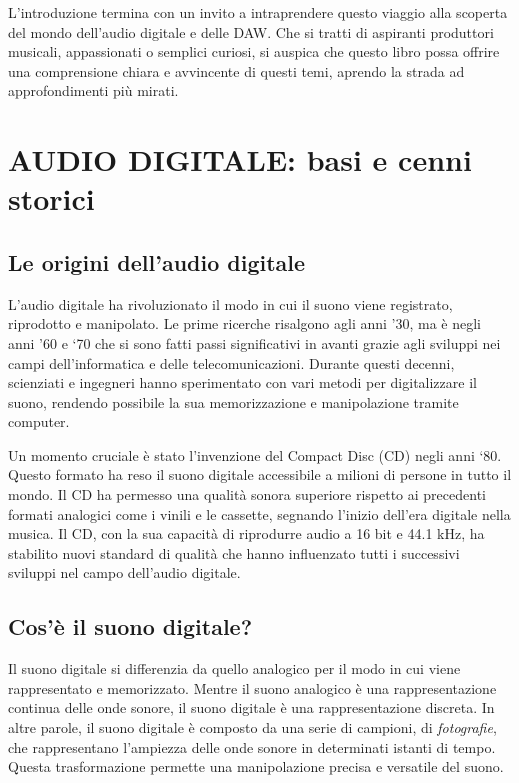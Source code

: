 \documentclass{book}
\begin{document}
L’introduzione termina con un invito a intraprendere questo viaggio alla scoperta del mondo dell’audio digitale e delle DAW. Che si tratti di aspiranti produttori musicali, appassionati o semplici curiosi, si auspica che questo libro possa offrire una comprensione chiara e avvincente di questi temi, aprendo la strada ad approfondimenti più mirati.

\newpage

\chapter{AUDIO DIGITALE: basi e cenni storici}

\section{Le origini dell’audio digitale}

L’audio digitale ha rivoluzionato il modo in cui il suono viene registrato, riprodotto e manipolato. Le prime ricerche risalgono agli anni ’30, ma è negli anni ’60 e ‘70 che si sono fatti passi significativi in avanti grazie agli sviluppi nei campi dell’informatica e delle telecomunicazioni. Durante questi decenni, scienziati e ingegneri hanno sperimentato con vari metodi per digitalizzare il suono, rendendo possibile la sua memorizzazione e manipolazione tramite computer.

Un momento cruciale è stato l’invenzione del Compact Disc (CD) negli anni ‘80. Questo formato ha reso il suono digitale accessibile a milioni di persone in tutto il mondo. Il CD ha permesso una qualità sonora superiore rispetto ai precedenti formati analogici come i vinili e le cassette, segnando l’inizio dell’era digitale nella musica. Il CD, con la sua capacità di riprodurre audio a 16 bit e 44.1 kHz, ha stabilito nuovi standard di qualità che hanno influenzato tutti i successivi sviluppi nel campo dell’audio digitale.

\section{Cos’è il suono digitale?}

Il suono digitale si differenzia da quello analogico per il modo in cui viene rappresentato e memorizzato. Mentre il suono analogico è una rappresentazione continua delle onde sonore, il suono digitale è una rappresentazione discreta. In altre parole, il suono digitale è composto da una serie di campioni, di \emph{fotografie}, che rappresentano l’ampiezza delle onde sonore in determinati istanti di tempo. Questa trasformazione permette una manipolazione precisa e versatile del suono.
\end{document}
